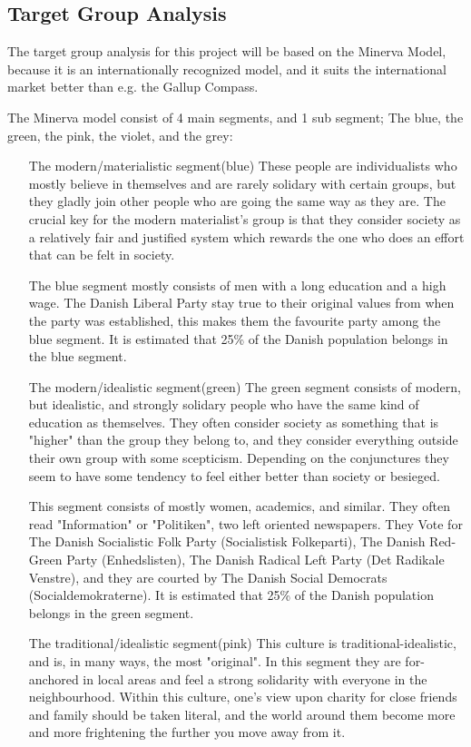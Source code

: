 \subsection{Target Group Analysis}
The target group analysis for this project will be based on the Minerva Model, because it is an internationally recognized model, and it suits the international market better than e.g. the Gallup Compass.

The Minerva model consist of 4 main segments, and 1 sub segment; The blue, the green, the pink, the violet, and the grey:
\begin{itemize}
\item[The modern/materialistic segment(blue)]
These people are individualists who mostly believe in themselves and are rarely solidary with certain groups, but they gladly join other people who are going the same way as they are. The crucial key for the modern materialist's group is that they consider society as a relatively fair and justified system which rewards the one who does an effort that can be felt in society.

The blue segment mostly consists of men with a long education and a high wage. The Danish Liberal Party stay true to their original values from when the party was established, this makes them the favourite party among the blue segment. It is estimated that 25\% of the Danish population belongs in the blue segment.

\item[The modern/idealistic segment(green)]
The green segment consists of modern, but idealistic, and strongly solidary people who have the same kind of education as themselves. They often consider society as something that is "higher" than the group they belong to, and they consider everything outside their own group with some scepticism. Depending on the conjunctures they seem to have some tendency to feel either better than society or besieged.

This segment consists of mostly women, academics, and similar. They often read "Information" or "Politiken", two left oriented newspapers. They Vote for The Danish Socialistic Folk Party (Socialistisk Folkeparti), The Danish Red-Green Party (Enhedslisten), The Danish Radical Left Party (Det Radikale Venstre), and they are courted by The Danish Social Democrats (Socialdemokraterne).
It is estimated that 25\% of the Danish population belongs in the green segment.

\item[The traditional/idealistic segment(pink)]
This culture is traditional-idealistic, and is, in many ways, the most "original". In this segment they are for-anchored in local areas and feel a strong solidarity with everyone in the neighbourhood. Within this culture, one's view upon charity for close friends and family should be taken literal, and the world around them become more and more frightening the further you move away from it.


\end{itemize}
